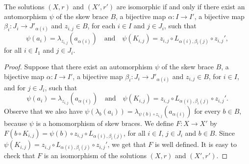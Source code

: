 \begin{theorem}\label{isomorphism}
	The solutions $(X,r)$ and $(X',r')$ are isomorphic if and only if
	there exist an automorphism $\psi$ of the skew brace $B$, a
	bijective map $\alpha\colon I\rightarrow I'$, a bijective map
	$\beta_i\colon J_i\rightarrow J'_{\alpha(i)}$ and $z_{i,j}\in B$,
	for each $i\in I$ and $j\in J_i$, such that
	$$\psi(a_i)=\lambda_{z_{i,j}}(a_{\alpha(i)})\quad\mbox{and}\quad \psi(K_{i,j})=z_{i,j}\circ L_{\alpha(i),\beta_i(j)}\circ z_{i,j}',$$
	for all $i\in I_1$ and $j\in J_i$.
\end{theorem}

\begin{proof}
	Suppose that there exist an automorphism $\psi$ of the skew brace
	$B$, a bijective map $\alpha\colon I\rightarrow I'$, a bijective map
	$\beta_i\colon J_i\rightarrow J'_{\alpha(i)}$
	and $z_{i,j}\in B$, for $i\in I$, and for $j\in J_i$, such that
	$$\psi(a_i)=\lambda_{z_{i,j}}(a_{\alpha(i)})\quad\mbox{and}\quad \psi(K_{i,j})=z_{i,j}\circ L_{\alpha(i),\beta_i(j)}\circ z_{i,j}'.$$
	Observe that we also have
	$\psi(\lambda_b(a_i))=\lambda_{\psi(b)\circ z_{i,j}}(a_{\alpha(i)})$ for
	every $b\in B$, because $\psi$ is a homomorphism of skew braces. We define
	$F\colon X\rightarrow X'$ by
	$F(b\circ K_{i,j})=\psi(b)\circ z_{i,j}\circ L_{\alpha(i),\beta_i(j)}$, for all $i\in
	I$, $j\in J_i$ and $b\in B$. Since
	$\psi(K_{i,j})=z_{i,j}\circ L_{\alpha(i),\beta_i(j)}\circ z_{i,j}'$,  we get
	that  $F$ is well defined. It is easy to check that $F$ is an
	isomorphism of the solutions $(X,r)$ and $(X',r')$.
	

\end{proof}
